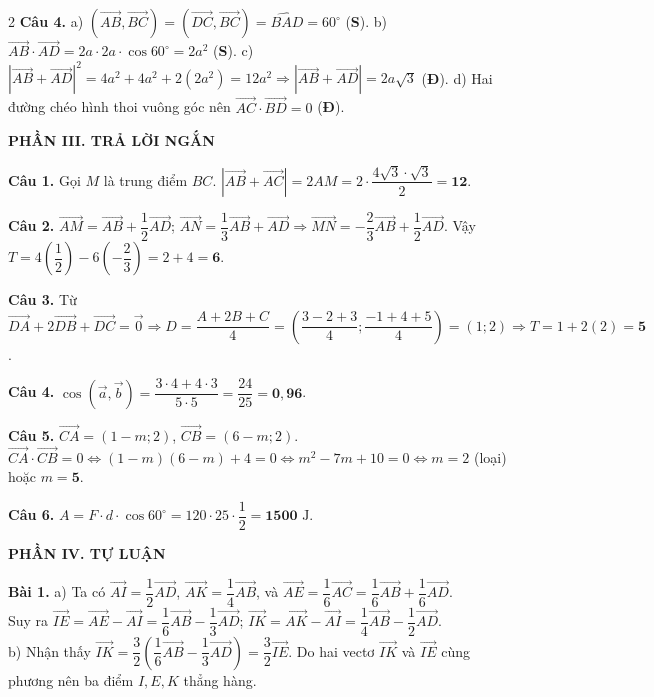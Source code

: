 \documentclass[10pt,a4paper]{article}
\begin{document}
\begin{multicols}{2}
\textbf{Câu 4.}
a) $(\vec{AB}, \vec{BC}) = (\vec{DC}, \vec{BC}) = \widehat{BAD} = 60^\circ$ (\textbf{S}).
b) $\vec{AB}\cdot\vec{AD} = 2a\cdot 2a\cdot\cos 60^\circ = 2a^2$ (\textbf{S}).
c) $|\vec{AB} + \vec{AD}|^2 = 4a^2 + 4a^2 + 2(2a^2) = 12a^2 \Rightarrow |\vec{AB} + \vec{AD}| = 2a\sqrt{3}$ (\textbf{Đ}).
d) Hai đường chéo hình thoi vuông góc nên $\vec{AC}\cdot\vec{BD} = 0$ (\textbf{Đ}).

\textbf{\color{accent}PHẦN III. TRẢ LỜI NGẮN}

\textbf{Câu 1.} Gọi $M$ là trung điểm $BC$. $|\vec{AB} + \vec{AC}| = 2AM = 2\cdot \dfrac{4\sqrt{3}\cdot\sqrt{3}}{2} = \mathbf{12}$.

\textbf{Câu 2.} $\vec{AM} = \vec{AB} + \dfrac{1}{2}\vec{AD}$; $\vec{AN} = \dfrac{1}{3}\vec{AB} + \vec{AD} \Rightarrow \vec{MN} = -\dfrac{2}{3}\vec{AB} + \dfrac{1}{2}\vec{AD}$. Vậy $T = 4\left(\dfrac{1}{2}\right) - 6\left(-\dfrac{2}{3}\right) = 2 + 4 = \mathbf{6}$.

\textbf{Câu 3.} Từ $\vec{DA} + 2\vec{DB} + \vec{DC} = \vec{0} \Rightarrow D = \dfrac{A + 2B + C}{4} = \left(\dfrac{3 - 2 + 3}{4}; \dfrac{-1 + 4 + 5}{4}\right) = (1; 2) \Rightarrow T = 1 + 2(2) = \mathbf{5}$.

\textbf{Câu 4.} $\cos(\vec{a}, \vec{b}) = \dfrac{3\cdot 4 + 4\cdot 3}{5\cdot 5} = \dfrac{24}{25} = \mathbf{0{,}96}$.

\textbf{Câu 5.} $\vec{CA} = (1 - m; 2)$, $\vec{CB} = (6 - m; 2)$. $\vec{CA}\cdot\vec{CB} = 0 \Leftrightarrow (1 - m)(6 - m) + 4 = 0 \Leftrightarrow m^2 - 7m + 10 = 0 \Leftrightarrow m = 2$ (loại) hoặc $m = \mathbf{5}$.

\textbf{Câu 6.} $A = F\cdot d\cdot\cos 60^\circ = 120\cdot 25\cdot \dfrac{1}{2} = \mathbf{1500}\text{ J}$.

\textbf{\color{accent}PHẦN IV. TỰ LUẬN}

\textbf{Bài 1.}
a) Ta có $\vec{AI} = \dfrac{1}{2}\vec{AD}$, $\vec{AK} = \dfrac{1}{4}\vec{AB}$, và $\vec{AE} = \dfrac{1}{6}\vec{AC} = \dfrac{1}{6}\vec{AB} + \dfrac{1}{6}\vec{AD}$.\\
Suy ra $\vec{IE} = \vec{AE} - \vec{AI} = \dfrac{1}{6}\vec{AB} - \dfrac{1}{3}\vec{AD}$; $\vec{IK} = \vec{AK} - \vec{AI} = \dfrac{1}{4}\vec{AB} - \dfrac{1}{2}\vec{AD}$.\\
b) Nhận thấy $\vec{IK} = \dfrac{3}{2}\left(\dfrac{1}{6}\vec{AB} - \dfrac{1}{3}\vec{AD}\right) = \dfrac{3}{2}\vec{IE}$. Do hai vectơ $\vec{IK}$ và $\vec{IE}$ cùng phương nên ba điểm $I, E, K$ thẳng hàng.


\end{multicols}
\end{document}
